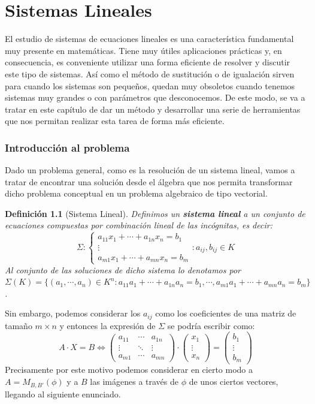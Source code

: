 \documentclass[10pt,a4paper,openright]{book}
\theoremstyle{break}
\newtheorem*{defi}{Definición}
\begin{document}
\chapter{Sistemas Lineales}
El estudio de sistemas de ecuaciones lineales es una característica fundamental muy presente en matemáticas. Tiene muy útiles aplicaciones prácticas y, en consecuencia, es conveniente utilizar una forma eficiente de resolver y discutir este tipo de sistemas. Así como el método de sustitución o de igualación sirven para cuando los sistemas son pequeños, quedan muy obsoletos cuando tenemos sistemas muy grandes o con parámetros que desconocemos. De este modo, se va a tratar en este capítulo de dar un método y desarrollar una serie de herramientas que nos permitan realizar esta tarea de forma más eficiente.

\subsection{Introducción al problema}
Dado un problema general, como es la resolución de un sistema lineal, vamos a tratar de encontrar una solución desde el álgebra que nos permita transformar dicho problema conceptual en un problema algebraico de tipo vectorial.

\begin{defi}[Sistema Lineal]
Definimos un \textbf{sistema lineal} a un conjunto de ecuaciones compuestas por combinación lineal de las incógnitas, es decir:
$$\Sigma: \begin{cases}a_{11} x_1+\cdots+a_{1n}x_n=b_1 \\ \vdots \\ a_{m1}x_1+\cdots+a_{mn}x_n=b_m\end{cases}: a_{ij}, b_{ij}\in K$$
Al conjunto de las soluciones de dicho sistema lo denotamos por $\Sigma(K)=\{(a_1, \cdots, a_n)\in K^n: a_{11}a_1+\cdots+a_{1n}a_n=b_1, \cdots, a_{m1}a_1+\cdots+a_{mn}a_n=b_m\}$.
\end{defi}

Sin embargo, podemos considerar los $a_{ij}$ como los coeficientes de una matriz de tamaño $m\times n$ y entonces la expresión de $\Sigma$ se podría escribir como:
$$A\cdot X=B\Leftrightarrow \begin{pmatrix}
a_{11} &\cdots & a_{1n} \\ \vdots & \ddots & \vdots \\ a_{m1}  & \cdots & a_{mn}\end{pmatrix} \cdot \begin{pmatrix}
x_1 \\ \vdots \\ x_n
\end{pmatrix}=\begin{pmatrix}
b_1 \\ \vdots \\ b_m
\end{pmatrix}$$
Precisamente por este motivo podemos considerar en cierto modo a $A = M_{B,B'}(\phi)$ y a $B$ las imágenes a través de $\phi$ de unos ciertos vectores, llegando al siguiente enunciado.
\end{document}
